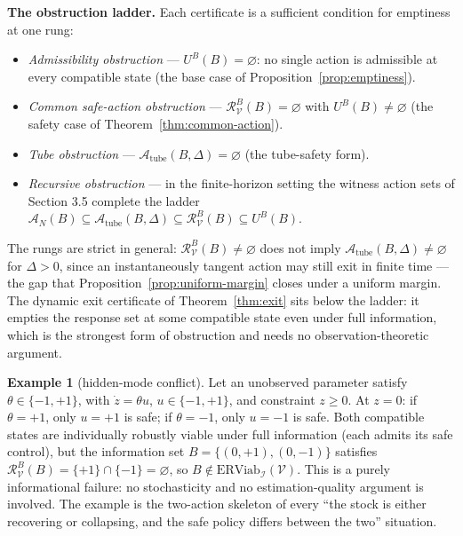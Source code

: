 \documentclass[11pt]{article}
\theoremstyle{definition}
\newtheorem{example}{Example}
\begin{document}
\textbf{The obstruction ladder.} Each certificate is a sufficient
condition for emptiness at one rung:
\begin{itemize}
\item \emph{Admissibility obstruction} --- \(U^B(B)=\varnothing\): no
single action is admissible at every compatible state (the base case of
Proposition~\ref{prop:emptiness}).
\item \emph{Common safe-action obstruction} ---
\(\mathcal{R}_{\mathcal{V}}^B(B)=\varnothing\) with
\(U^B(B)\neq\varnothing\) (the safety case of
Theorem~\ref{thm:common-action}).
\item \emph{Tube obstruction} ---
\(\mathcal{A}_{\mathrm{tube}}(B,\Delta)=\varnothing\) (the tube-safety
form).
\item \emph{Recursive obstruction} --- in the finite-horizon setting the
witness action sets of Section 3.5 complete the ladder
\(\mathcal{A}_N(B)\subseteq\mathcal{A}_{\mathrm{tube}}(B,\Delta)\subseteq\mathcal{R}_{\mathcal{V}}^B(B)\subseteq U^B(B)\).
\end{itemize}
The rungs are strict in general: \(\mathcal{R}_{\mathcal{V}}^B(B)\neq\varnothing\)
does not imply \(\mathcal{A}_{\mathrm{tube}}(B,\Delta)\neq\varnothing\)
for \(\Delta>0\), since an instantaneously tangent action may still exit
in finite time --- the gap that Proposition~\ref{prop:uniform-margin}
closes under a uniform margin. The dynamic exit certificate of
Theorem~\ref{thm:exit} sits below the ladder: it empties the response
set at some compatible state even under full information, which is the
strongest form of obstruction and needs no observation-theoretic
argument.

\begin{example}[hidden-mode conflict]\label{ex:hidden-mode} Let an unobserved parameter satisfy
\(\theta \in \{-1, +1\}\), with \(\dot z = \theta u\),
\(u \in \{-1, +1\}\), and constraint \(z \ge 0\). At \(z = 0\): if
\(\theta = +1\), only \(u = +1\) is safe; if \(\theta = -1\), only
\(u = -1\) is safe. Both compatible states are individually robustly
viable under full information (each admits its safe control), but the
information set \(B = \{(0, +1), (0, -1)\}\) satisfies
\(\mathcal{R}_{\mathcal{V}}^B(B) = \{+1\} \cap \{-1\} = \varnothing\),
so \(B \notin \mathrm{ERViab}_{\mathcal{I}}(\mathcal{V})\). This is a
purely informational failure: no stochasticity and no estimation-quality
argument is involved. The example is the two-action skeleton of every
``the stock is either recovering or collapsing, and the safe policy
differs between the two'' situation.

\end{example}
\end{document}
